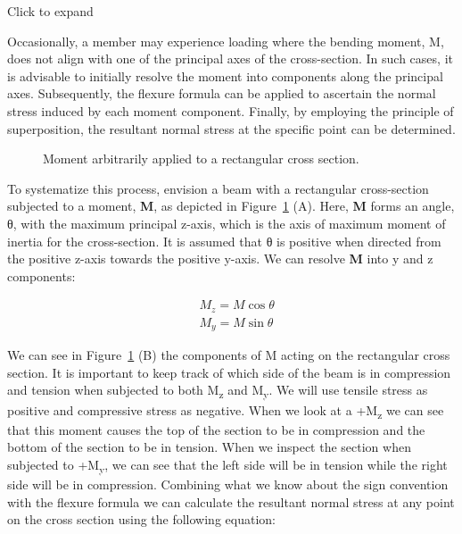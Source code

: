 \documentclass[
  letterpaper,
  DIV=11,
  numbers=noendperiod]{scrreprt}
\theoremstyle{definition}
\theoremstyle{remark}
\begin{document}
Click to expand

Occasionally, a member may experience loading where the bending moment,
M, does not align with one of the principal axes of the cross-section.
In such cases, it is advisable to initially resolve the moment into
components along the principal axes. Subsequently, the flexure formula
can be applied to ascertain the normal stress induced by each moment
component. Finally, by employing the principle of superposition, the
resultant normal stress at the specific point can be determined.

\begin{figure}


\caption{\label{fig-9.12}Moment arbitrarily applied to a rectangular
cross section.}

\end{figure}%

To systematize this process, envision a beam with a rectangular
cross-section subjected to a moment, \textbf{M}, as depicted in
Figure~\ref{fig-9.12} (A). Here, \textbf{M} forms an angle, θ, with the
maximum principal z-axis, which is the axis of maximum moment of inertia
for the cross-section. It is assumed that θ is positive when directed
from the positive z-axis towards the positive y-axis. We can resolve
\textbf{M} into y and z components:

\[
\begin{aligned}
& M_z=M \cos \theta \\
& M_y=M \sin \theta
\end{aligned}
\]

We can see in Figure~\ref{fig-9.12} (B) the components of M acting on
the rectangular cross section. It is important to keep track of which
side of the beam is in compression and tension when subjected to both
M\textsubscript{z} and M\textsubscript{y}. We will use tensile stress as
positive and compressive stress as negative. When we look at a
+M\textsubscript{z} we can see that this moment causes the top of the
section to be in compression and the bottom of the section to be in
tension. When we inspect the section when subjected to
+M\textsubscript{y}, we can see that the left side will be in tension
while the right side will be in compression. Combining what we know
about the sign convention with the flexure formula we can calculate the
resultant normal stress at any point on the cross section using the
following equation:
\end{document}
